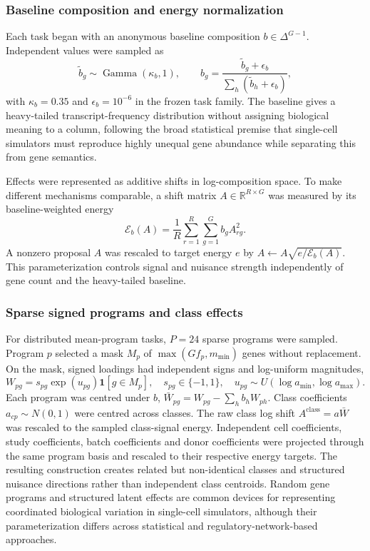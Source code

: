 \documentclass[12pt]{article}
\begin{document}
\subsubsection*{Baseline composition and energy normalization}

Each task began with an anonymous baseline composition $b\in\Delta^{G-1}$. Independent values were sampled as
\begin{equation}
\tilde b_g\sim\operatorname{Gamma}(\kappa_b,1),\qquad
b_g=\frac{\tilde b_g+\epsilon_b}{\sum_h(\tilde b_h+\epsilon_b)},
\end{equation}
with $\kappa_b=0.35$ and $\epsilon_b=10^{-6}$ in the frozen task family. The baseline gives a heavy-tailed transcript-frequency distribution without assigning biological meaning to a column, following the broad statistical premise that single-cell simulators must reproduce highly unequal gene abundance while separating this from gene semantics\cite{zappia2017splatter,zhang2019symsim,sun2021scdesign2}.

Effects were represented as additive shifts in log-composition space. To make different mechanisms comparable, a shift matrix $A\in\mathbb{R}^{R\times G}$ was measured by its baseline-weighted energy
\begin{equation}
\mathcal{E}_b(A)=\frac{1}{R}\sum_{r=1}^{R}\sum_{g=1}^{G} b_g A_{rg}^{2}.
\end{equation}
A nonzero proposal $A$ was rescaled to target energy $e$ by $A\leftarrow A\sqrt{e/\mathcal{E}_b(A)}$. This parameterization controls signal and nuisance strength independently of gene count and the heavy-tailed baseline.

\subsubsection*{Sparse signed programs and class effects}

For distributed mean-program tasks, $P=24$ sparse programs were sampled. Program $p$ selected a mask $M_p$ of $\max(Gf_p,m_{\min})$ genes without replacement. On the mask, signed loadings had independent signs and log-uniform magnitudes,
\begin{equation}
W_{pg}=s_{pg}\exp(u_{pg})\mathbf{1}[g\in M_p],\quad s_{pg}\in\{-1,1\},\quad u_{pg}\sim U(\log a_{\min},\log a_{\max}).
\end{equation}
Each program was centred under $b$, $\bar W_{pg}=W_{pg}-\sum_h b_hW_{ph}$. Class coefficients $a_{cp}\sim N(0,1)$ were centred across classes. The raw class log shift $A^{\mathrm{class}}=a\bar W$ was rescaled to the sampled class-signal energy. Independent cell coefficients, study coefficients, batch coefficients and donor coefficients were projected through the same program basis and rescaled to their respective energy targets. The resulting construction creates related but non-identical classes and structured nuisance directions rather than independent class centroids. Random gene programs and structured latent effects are common devices for representing coordinated biological variation in single-cell simulators, although their parameterization differs across statistical and regulatory-network-based approaches\cite{zhang2019symsim,dibaeinia2020sergio,song2024scdesign3}.
\end{document}
